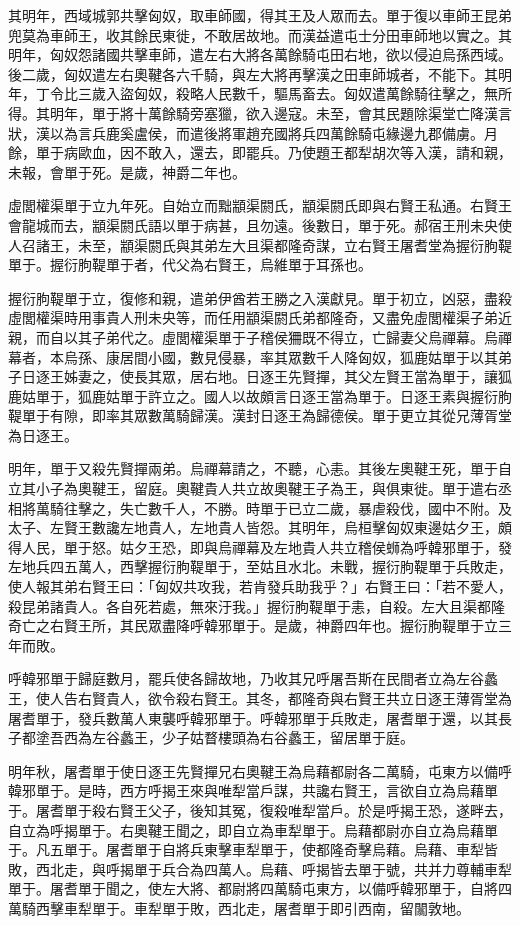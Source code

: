 \begin{pinyinscope}
其明年，西域城郭共擊匈奴，取車師國，得其王及人眾而去。單于復以車師王昆弟兜莫為車師王，收其餘民東徙，不敢居故地。而漢益遣屯士分田車師地以實之。其明年，匈奴怨諸國共擊車師，遣左右大將各萬餘騎屯田右地，欲以侵迫烏孫西域。後二歲，匈奴遣左右奧鞬各六千騎，與左大將再擊漢之田車師城者，不能下。其明年，丁令比三歲入盜匈奴，殺略人民數千，驅馬畜去。匈奴遣萬餘騎往擊之，無所得。其明年，單于將十萬餘騎旁塞獵，欲入邊寇。未至，會其民題除渠堂亡降漢言狀，漢以為言兵鹿奚盧侯，而遣後將軍趙充國將兵四萬餘騎屯緣邊九郡備虜。月餘，單于病歐血，因不敢入，還去，即罷兵。乃使題王都犁胡次等入漢，請和親，未報，會單于死。是歲，神爵二年也。

虛閭權渠單于立九年死。自始立而黜顓渠閼氏，顓渠閼氏即與右賢王私通。右賢王會龍城而去，顓渠閼氏語以單于病甚，且勿遠。後數日，單于死。郝宿王刑未央使人召諸王，未至，顓渠閼氏與其弟左大且渠都隆奇謀，立右賢王屠耆堂為握衍朐鞮單于。握衍朐鞮單于者，代父為右賢王，烏維單于耳孫也。

握衍朐鞮單于立，復修和親，遣弟伊酋若王勝之入漢獻見。單于初立，凶惡，盡殺虛閭權渠時用事貴人刑未央等，而任用顓渠閼氏弟都隆奇，又盡免虛閭權渠子弟近親，而自以其子弟代之。虛閭權渠單于子稽侯狦既不得立，亡歸妻父烏禪幕。烏禪幕者，本烏孫、康居間小國，數見侵暴，率其眾數千人降匈奴，狐鹿姑單于以其弟子日逐王姊妻之，使長其眾，居右地。日逐王先賢撣，其父左賢王當為單于，讓狐鹿姑單于，狐鹿姑單于許立之。國人以故頗言日逐王當為單于。日逐王素與握衍朐鞮單于有隙，即率其眾數萬騎歸漢。漢封日逐王為歸德侯。單于更立其從兄薄胥堂為日逐王。

明年，單于又殺先賢撣兩弟。烏禪幕請之，不聽，心恚。其後左奧鞬王死，單于自立其小子為奧鞬王，留庭。奧鞬貴人共立故奧鞬王子為王，與俱東徙。單于遣右丞相將萬騎往擊之，失亡數千人，不勝。時單于已立二歲，暴虐殺伐，國中不附。及太子、左賢王數讒左地貴人，左地貴人皆怨。其明年，烏桓擊匈奴東邊姑夕王，頗得人民，單于怒。姑夕王恐，即與烏禪幕及左地貴人共立稽侯蛳為呼韓邪單于，發左地兵四五萬人，西擊握衍朐鞮單于，至姑且水北。未戰，握衍朐鞮單于兵敗走，使人報其弟右賢王曰：「匈奴共攻我，若肯發兵助我乎？」右賢王曰：「若不愛人，殺昆弟諸貴人。各自死若處，無來汙我。」握衍朐鞮單于恚，自殺。左大且渠都隆奇亡之右賢王所，其民眾盡降呼韓邪單于。是歲，神爵四年也。握衍朐鞮單于立三年而敗。

呼韓邪單于歸庭數月，罷兵使各歸故地，乃收其兄呼屠吾斯在民間者立為左谷蠡王，使人告右賢貴人，欲令殺右賢王。其冬，都隆奇與右賢王共立日逐王薄胥堂為屠耆單于，發兵數萬人東襲呼韓邪單于。呼韓邪單于兵敗走，屠耆單于還，以其長子都塗吾西為左谷蠡王，少子姑瞀樓頭為右谷蠡王，留居單于庭。

明年秋，屠耆單于使日逐王先賢撣兄右奧鞬王為烏藉都尉各二萬騎，屯東方以備呼韓邪單于。是時，西方呼揭王來與唯犁當戶謀，共讒右賢王，言欲自立為烏藉單于。屠耆單于殺右賢王父子，後知其冤，復殺唯犁當戶。於是呼揭王恐，遂畔去，自立為呼揭單于。右奧鞬王聞之，即自立為車犁單于。烏藉都尉亦自立為烏藉單于。凡五單于。屠耆單于自將兵東擊車犁單于，使都隆奇擊烏藉。烏藉、車犁皆敗，西北走，與呼揭單于兵合為四萬人。烏藉、呼揭皆去單于號，共并力尊輔車犁單于。屠耆單于聞之，使左大將、都尉將四萬騎屯東方，以備呼韓邪單于，自將四萬騎西擊車犁單于。車犁單于敗，西北走，屠耆單于即引西南，留闟敦地。


\end{pinyinscope}
